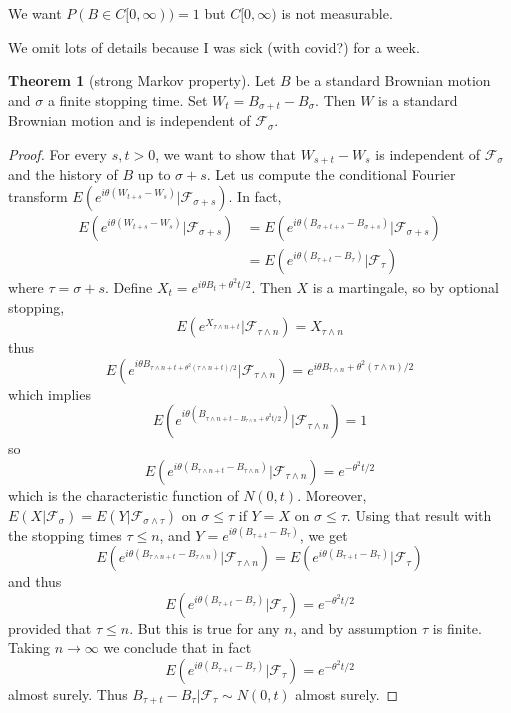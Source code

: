 \documentclass[12pt]{book}
\theoremstyle{definition}
\newtheorem{theorem}{Theorem}[chapter]
\begin{document}
We want $P(B \in C[0, \infty)) = 1$ but $C[0, \infty)$ is not measurable.

We omit lots of details because I was sick (with covid?) for a week.

\begin{theorem}[strong Markov property]
Let $B$ be a standard Brownian motion and $\sigma$ a finite stopping time. Set $W_t = B_{\sigma + t} - B_\sigma$.
Then $W$ is a standard Brownian motion and is independent of $\mathcal F_\sigma$.
\end{theorem}
\begin{proof}
For every $s, t > 0$, we want to show that $W_{s + t} - W_s$ is independent of $\mathcal F_\sigma$ and the history of $B$ up to $\sigma + s$.
Let us compute the conditional Fourier transform $E(e^{i\theta(W_{t+s} - W_s)}|\mathcal F_{\sigma + s})$.
In fact,
\begin{align*}
E(e^{i\theta(W_{t+s} - W_s)}|\mathcal F_{\sigma + s}) &= E(e^{i\theta(B_{\sigma + t + s} - B_{\sigma + s})}|\mathcal F_{\sigma + s})\\
&= E(e^{i\theta(B_{\tau + t} - B_\tau)}|\mathcal F_\tau)
\end{align*}
where $\tau = \sigma + s$.
Define $X_t = e^{i\theta B_t + \theta^2 t/2}$.
Then $X$ is a martingale, so by optional stopping,
$$E(e^{X_{\tau \wedge n + t}}|\mathcal F_{\tau \wedge n}) = X_{\tau \wedge n}$$
thus
$$E(e^{i\theta B_{\tau \wedge n + t + \theta^2(\tau \wedge n + t)/2} }|\mathcal F_{\tau \wedge n}) = e^{i\theta B_{\tau \wedge n} + \theta^2(\tau \wedge n)/2}$$
which implies
$$E(e^{i\theta(B_{\tau \wedge n + t - B_{\tau \wedge n} + \theta^2t/2})}|\mathcal F_{\tau \wedge n}) = 1$$
so
$$E(e^{i\theta(B_{\tau\wedge n + t} - B_{\tau \wedge n})}|\mathcal F_{\tau \wedge n}) = e^{-\theta^2 t/2}$$
which is the characteristic function of $N(0, t)$.
Moreover, $E(X|\mathcal F_\sigma) = E(Y|\mathcal F_{\sigma \wedge \tau})$ on $\sigma \leq \tau$ if $Y = X$ on $\sigma \leq \tau$.
Using that result with the stopping times $\tau \leq n$, and $Y = e^{i\theta(B_{\tau + t} - B_\tau)}$, we get
$$E(e^{i\theta(B_{\tau\wedge n + t} - B_{\tau \wedge n})}|\mathcal F_{\tau \wedge n}) = E(e^{i\theta(B_{\tau + t} - B_\tau)}|\mathcal F_\tau)$$
and thus
$$E(e^{i\theta(B_{\tau + t} - B_\tau)}|\mathcal F_\tau) = e^{-\theta^2 t/2}$$
provided that $\tau \leq n$.
But this is true for any $n$, and by assumption $\tau$ is finite.
Taking $n \to \infty$ we conclude that in fact
$$E(e^{i\theta(B_{\tau + t} - B_\tau)}|\mathcal F_\tau) = e^{-\theta^2 t/2}$$
almost surely.
Thus $B_{\tau + t} - B_\tau|\mathcal F_\tau \sim N(0, t)$ almost surely.
\end{proof}
\end{document}
